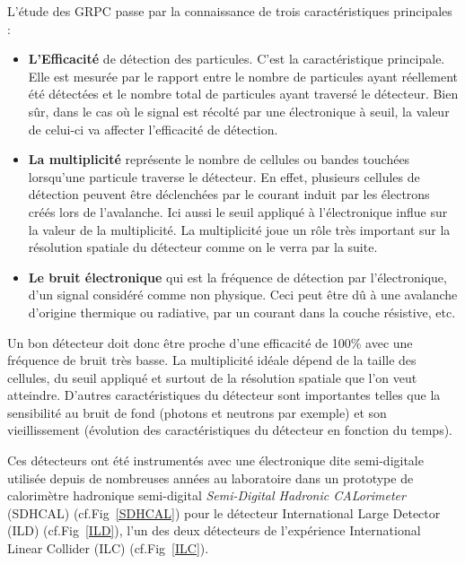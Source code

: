 L'étude des GRPC passe par la connaissance de trois caractéristiques principales :
\begin{itemize}[label=$\bullet$]
	\item \textbf{L'Efficacité} de détection des particules. C'est la caractéristique principale. Elle est mesurée par le rapport entre le nombre de particules ayant réellement été détectées et le nombre total de particules ayant traversé le détecteur. Bien sûr, dans le cas où le signal est récolté par une électronique à seuil, la valeur de celui-ci va affecter l'efficacité de détection.
	\item \textbf{La multiplicité} représente le nombre de cellules ou bandes touchées lorsqu'une particule traverse le détecteur. En effet, plusieurs cellules de détection peuvent être déclenchées par le courant induit par les électrons créés lors de l'avalanche. Ici aussi le seuil appliqué à l'électronique influe sur la valeur de la multiplicité. La multiplicité joue un rôle très important sur la résolution spatiale du détecteur comme on le verra par la suite.
	\item \textbf{Le bruit électronique} qui est la fréquence de détection par l'électronique, d'un signal considéré comme non physique. Ceci peut être dû à une avalanche d'origine thermique ou radiative, par un courant dans la couche résistive, etc. 
\end{itemize}

Un bon détecteur doit donc être proche d'une efficacité de 100\% avec une fréquence de bruit très basse. La multiplicité idéale dépend de la taille des cellules, du seuil appliqué et surtout de la résolution spatiale que l'on veut atteindre. D'autres caractéristiques du détecteur sont importantes telles que la sensibilité au bruit de fond (photons et neutrons par exemple) et son vieillissement (évolution des caractéristiques du détecteur en fonction du temps).

Ces détecteurs ont été instrumentés avec une électronique dite semi-digitale utilisée depuis de nombreuses années au laboratoire dans un prototype de calorimètre hadronique semi-digital \textit{Semi-Digital Hadronic CALorimeter} (SDHCAL) (cf.Fig~\ref{SDHCAL}) \cite{Buridon:2016ill} pour le détecteur International Large Detector (ILD) (cf.Fig~\ref{ILD}), l'un des deux détecteurs de l'expérience International Linear Collider (ILC) (cf.Fig~\ref{ILC}).

